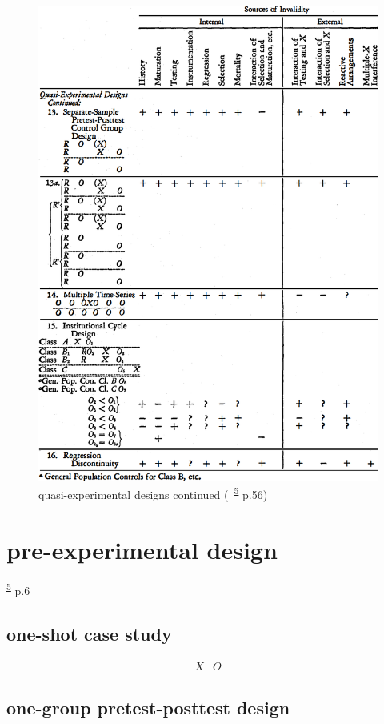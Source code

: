 \documentclass[
]{book}
\theoremstyle{definition}
\theoremstyle{definition}
\theoremstyle{definition}
\theoremstyle{definition}
\theoremstyle{remark}
\begin{document}
\begin{figure}
\includegraphics[width=0.65\linewidth]{img/quasi-experimental-designs-2} \caption{quasi-experimental designs continued (~\textsuperscript{\protect\hyperlink{ref-campbell1963}{5}} p.56)}\label{fig:unnamed-chunk-3}
\end{figure}

\hypertarget{pre-experimental-design}{%
\section{pre-experimental design}\label{pre-experimental-design}}

\textsuperscript{\protect\hyperlink{ref-campbell1963}{5}} p.6

\hypertarget{one-shot-case-study}{%
\subsection{one-shot case study}\label{one-shot-case-study}}

\[
\begin{array}{ccc}
X & O
\end{array}
\]

\hypertarget{one-group-pretest-posttest-design}{%
\subsection{one-group pretest-posttest design}\label{one-group-pretest-posttest-design}}
\end{document}
